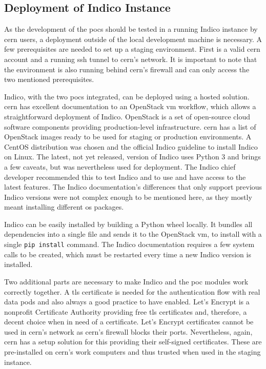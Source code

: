 \subsection{Deployment of Indico Instance}

As the development of the \glspl{poc} should be tested in a running Indico instance by \gls{cern} users, a deployment outside of the local development machine is necessary. A few prerequisites are needed to set up a staging environment. First is a valid \gls{cern} account and a running \gls{ssh} tunnel to \gls{cern}'s network. It is important to note that the environment is also running behind \gls{cern}'s firewall and can only access the two mentioned prerequisites.

Indico, with the two \glspl{poc} integrated, can be deployed using a hosted solution. \gls{cern} has excellent documentation to an OpenStack \gls{vm} \cite{openstack} workflow, which allows a straightforward deployment of Indico. OpenStack is a set of open-source cloud software components providing production-level infrastructure. \gls{cern} has a list of OpenStack images ready to be used for staging or production environments. A CentOS \cite{centos} distribution was chosen and the official Indico guideline to install Indico on Linux. The latest, not yet released, version of Indico uses Python 3 and brings a few caveats, but was nevertheless used for deployment. The Indico chief developer recommended this to test Indico and to use and have access to the latest features. The Indico documentation's differences that only support previous Indico versions were not complex enough to be mentioned here, as they mostly meant installing different \gls{os} packages.

Indico can be easily installed by building a Python wheel locally. It bundles all dependencies into a single file and sends it to the OpenStack \gls{vm}, to install with a single \texttt{pip install} command. The Indico documentation requires a few system calls to be created, which must be restarted every time a new Indico version is installed.

Two additional parts are necessary to make Indico and the \gls{poc} modules work correctly together. A \gls{tls} certificate is needed for the authentication flow with real data pods and also always a good practice to have enabled. Let's Encrypt \cite{letsencrypt} is a nonprofit Certificate Authority providing free \gls{tls} certificates and, therefore, a decent choice when in need of a certificate. Let's Encrypt certificates cannot be used in \gls{cern}'s network as \gls{cern}'s firewall blocks their ports. Nevertheless, again, \gls{cern} has a setup solution for this providing their self-signed certificates. These are pre-installed on \gls{cern}'s work computers and thus trusted when used in the staging instance.

